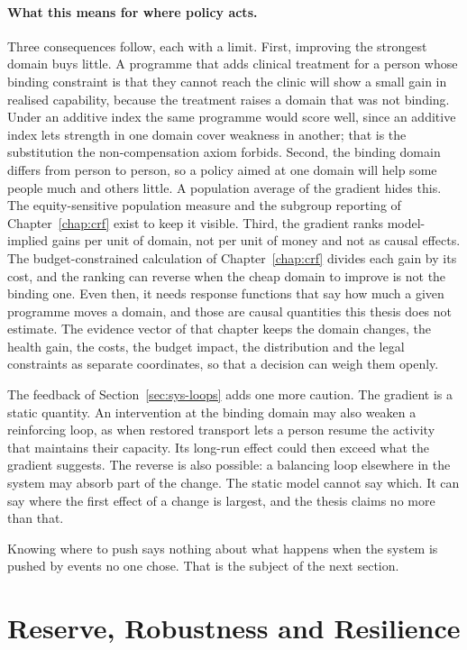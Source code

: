 \paragraph{What this means for where policy acts.} Three consequences follow,
each with a limit. First, improving the strongest domain buys little.
A programme that adds clinical treatment for a person whose binding constraint
is that they cannot reach the clinic will show a small gain in realised
capability, because the treatment raises a domain that was not binding. Under
an additive index the same programme would score well, since an additive
index lets strength in one domain cover weakness in another; that is the
substitution the non-compensation axiom forbids. Second, the binding domain
differs from person to person, so a policy aimed at one domain will help some
people much and others little. A population average of the gradient hides
this. The equity-sensitive population measure and the subgroup reporting of
Chapter~\ref{chap:crf} exist to keep it visible. Third, the gradient ranks
model-implied gains per unit of domain, not per unit of money and not as
causal effects. The budget-constrained calculation of Chapter~\ref{chap:crf}
divides each gain by its cost, and the ranking can reverse when the cheap
domain to improve is not the binding one. Even then, it needs response
functions that say how much a given programme moves a domain, and those are
causal quantities this thesis does not estimate. The evidence vector of that
chapter keeps the domain changes, the health gain, the costs, the budget
impact, the distribution and the legal constraints as separate coordinates,
so that a decision can weigh them openly.

The feedback of Section~\ref{sec:sys-loops} adds one more caution. The
gradient is a static quantity. An intervention at the binding domain may also
weaken a reinforcing loop, as when restored transport lets a person resume the
activity that maintains their capacity. Its long-run effect could then exceed
what the gradient suggests. The reverse is also possible: a balancing loop
elsewhere in the system may absorb part of the change. The static model cannot
say which. It can say where the first effect of a change is largest, and the
thesis claims no more than that.

Knowing where to push says nothing about what happens when the system is
pushed by events no one chose. That is the subject of the next section.

\section{Reserve, Robustness and Resilience}
\label{sec:sys-resilience}

